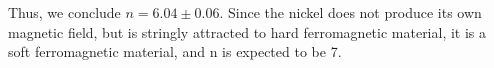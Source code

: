 \documentclass[letterpaper]{article}
\begin{document}
Thus, we conclude $n=6.04\pm0.06$. Since the nickel does not produce its own magnetic field, but is stringly attracted to hard ferromagnetic material, it is a soft ferromagnetic material, and n is expected to be 7.
%
%
%
%
\end{document}
